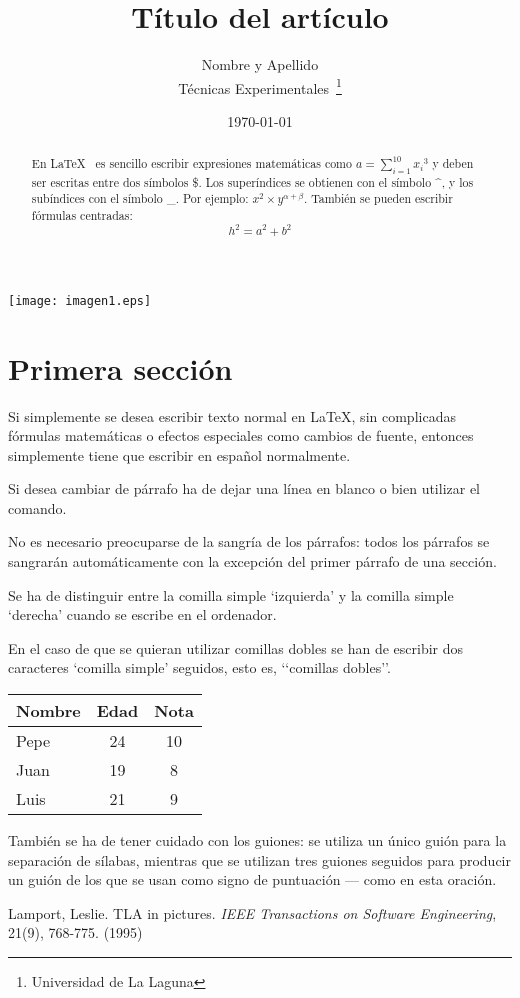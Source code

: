 \documentclass[a4paper,12pt]{article}
\begin{document}
\texttt{[image: imagen1.eps]}
\title{Título del artículo}
\author{Nombre y Apellido \\
Técnicas Experimentales~\footnote{Universidad de La Laguna}
}
\date{\today}
\maketitle
\begin{abstract}
En \LaTeX{}~\cite{Lam:86} es sencillo escribir expresiones
matemáticas como $a=\sum_{i=1}^{10} {x_i}^{3}$
y deben ser escritas entre dos símbolos \$.
Los superíndices se obtienen con el símbolo \^{}, y
los subíndices con el símbolo \_.
Por ejemplo: $x^2 \times y^{\alpha + \beta}$.
También se pueden escribir fórmulas centradas:
\[h^2=a^2 + b^2 \]
\end{abstract}

\section{Primera sección}
Si simplemente se desea escribir texto normal en LaTeX,
sin complicadas f\'ormulas matem\'aticas o efectos especiales
como cambios de fuente, entonces simplemente tiene que escribir
en espa\~nol normalmente.\par
Si desea cambiar de párrafo ha de dejar una línea en blanco o bien
utilizar el comando.

No es necesario preocuparse de la sangría de los párrafos:
todos los párrafos se sangrarán automáticamente con la excepción
del primer párrafo de una sección.

Se ha de distinguir entre la comilla simple ‘izquierda’
y la comilla simple ‘derecha’ cuando se escribe en el ordenador.

En el caso de que se quieran utilizar comillas dobles se han de
escribir dos caracteres ‘comilla simple’ seguidos, esto es,
‘‘comillas dobles’’.

\bigskip
\begin{tabular}{|l|c|c|}
\hline
Nombre & Edad & Nota \\ \hline
Pepe & 24 & 10 \\ \hline
Juan & 19 & 8 \\ \hline
Luis & 21 & 9 \\ \hline
\end{tabular}

También se ha de tener cuidado con los guiones: se utiliza un único
guión para la separación de sílabas, mientras que se utilizan
tres guiones seguidos para producir un guión de los que se usan
como signo de puntuación --- como en esta oración.
\begin{thebibliography}{00}
Lamport, Leslie.
TLA in pictures.
\emph{IEEE Transactions on Software Engineering},
21(9), 768-775.
(1995)
\end{thebibliography}
\end{document}
